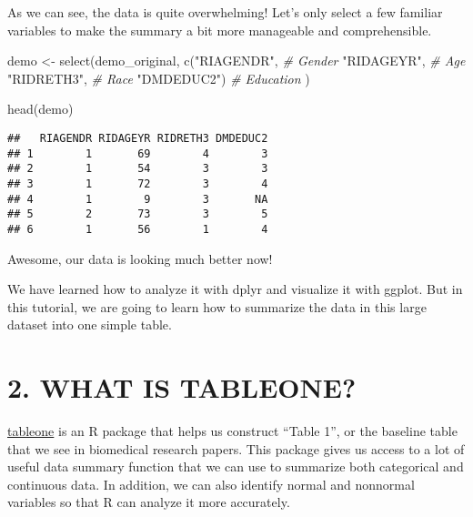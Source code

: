 \documentclass[
]{book}
\newenvironment{Shaded}{\begin{snugshade}}{\end{snugshade}}
\newcommand{\CommentTok}[1]{\textcolor[rgb]{0.56,0.35,0.01}{\textit{#1}}}
\newcommand{\FunctionTok}[1]{\textcolor[rgb]{0.00,0.00,0.00}{#1}}
\newcommand{\NormalTok}[1]{#1}
\newcommand{\OtherTok}[1]{\textcolor[rgb]{0.56,0.35,0.01}{#1}}
\newcommand{\StringTok}[1]{\textcolor[rgb]{0.31,0.60,0.02}{#1}}
\begin{document}
As we can see, the data is quite overwhelming! Let's only select a few familiar variables to make the summary a bit more manageable and comprehensible.

\begin{Shaded}
\begin{Highlighting}[]
\NormalTok{demo }\OtherTok{\textless{}{-}} \FunctionTok{select}\NormalTok{(demo\_original, }
               \FunctionTok{c}\NormalTok{(}\StringTok{"RIAGENDR"}\NormalTok{, }\CommentTok{\# Gender}
                 \StringTok{"RIDAGEYR"}\NormalTok{, }\CommentTok{\# Age}
                 \StringTok{"RIDRETH3"}\NormalTok{, }\CommentTok{\# Race}
                 \StringTok{"DMDEDUC2"}\NormalTok{) }\CommentTok{\# Education}
\NormalTok{               )}
\end{Highlighting}
\end{Shaded}

\begin{Shaded}
\begin{Highlighting}[]
\FunctionTok{head}\NormalTok{(demo)}
\end{Highlighting}
\end{Shaded}

\begin{verbatim}
##   RIAGENDR RIDAGEYR RIDRETH3 DMDEDUC2
## 1        1       69        4        3
## 2        1       54        3        3
## 3        1       72        3        4
## 4        1        9        3       NA
## 5        2       73        3        5
## 6        1       56        1        4
\end{verbatim}

Awesome, our data is looking much better now!

We have learned how to analyze it with dplyr and visualize it with ggplot. But in this tutorial, we are going to learn how to summarize the data in this large dataset into one simple table.

\hypertarget{what-is-tableone}{%
\section{2. WHAT IS TABLEONE?}\label{what-is-tableone}}

\href{http://rstudio-pubs-static.s3.amazonaws.com/13321_da314633db924dc78986a850813a50d5.html}{tableone} is an R package that helps us construct ``Table 1'', or the baseline table that we see in biomedical research papers. This package gives us access to a lot of useful data summary function that we can use to summarize both categorical and continuous data. In addition, we can also identify normal and nonnormal variables so that R can analyze it more accurately.
\end{document}
